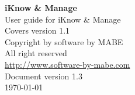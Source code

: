 \documentclass[12pt,a4]{article}
\begin{document}
\begin{titlepage}
\begin{center}
{
	\large
    	\vspace{5.5cm}
    	\textbf{\Huge iKnow \& Manage} \\
    	\vspace{1cm}
    	User guide for iKnow \& Manage \\
    	\vspace{1cm}
    	Covers version 1.1 \\
    	\vspace{10cm}
}
    	Copyright by software by MABE\\
    	All right reserved \\
    	\href{http://www.software-by-mabe.com}{http://www.software-by-mabe.com} \\
    	\vspace{1cm}
	Document version 1.3 \\
    	\today
\end{center}
\end{titlepage}
\newpage
\tableofcontents
\newpage
\end{document}
